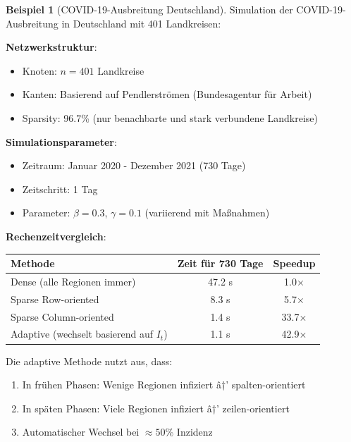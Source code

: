 ﻿\documentclass[a4paper,12pt]{report}
\theoremstyle{definition}
\newtheorem{beispiel}{Beispiel}
\begin{document}
	\begin{beispiel}[COVID-19-Ausbreitung Deutschland]
		Simulation der COVID-19-Ausbreitung in Deutschland mit 401 Landkreisen:
		
		\textbf{Netzwerkstruktur}:
		\begin{itemize}
			\item Knoten: $n = 401$ Landkreise
			\item Kanten: Basierend auf Pendlerströmen (Bundesagentur für Arbeit)
			\item Sparsity: 96.7\% (nur benachbarte und stark verbundene Landkreise)
		\end{itemize}
		
		\textbf{Simulationsparameter}:
		\begin{itemize}
			\item Zeitraum: Januar 2020 - Dezember 2021 (730 Tage)
			\item Zeitschritt: 1 Tag
			\item Parameter: $\beta = 0.3$, $\gamma = 0.1$ (variierend mit Maßnahmen)
		\end{itemize}
		
		\textbf{Rechenzeitvergleich}:
		\begin{center}
			\begin{tabular}{|l|c|c|}
				\hline
				\textbf{Methode} & \textbf{Zeit für 730 Tage} & \textbf{Speedup} \\
				\hline
				Dense (alle Regionen immer) & 47.2 s & 1.0$\times$ \\
				Sparse Row-oriented & 8.3 s & 5.7$\times$ \\
				Sparse Column-oriented & 1.4 s & 33.7$\times$ \\
				Adaptive (wechselt basierend auf $I_t$) & 1.1 s & 42.9$\times$ \\
				\hline
			\end{tabular}
		\end{center}
		
		Die adaptive Methode nutzt aus, dass:
		\begin{enumerate}
			\item In frühen Phasen: Wenige Regionen infiziert â†’ spalten-orientiert
			\item In späten Phasen: Viele Regionen infiziert â†’ zeilen-orientiert
			\item Automatischer Wechsel bei $\approx 50\%$ Inzidenz
		\end{enumerate}
	\end{beispiel}
	
\end{document}
